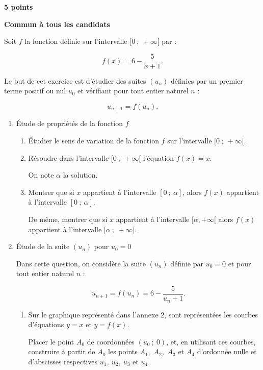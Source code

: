 \textbf{ \hfill 5 points}
 
\textbf{Commun à tous les candidats}

\medskip

Soit $f$ la fonction définie sur l'intervalle $[0~;~+ \infty[$ par :

\[ f(x) = 6 -  \dfrac{5}{x + 1}.\]
 
Le but de cet exercice est d'étudier des suites $\left(u_{n}\right)$ définies par un premier terme positif ou nul $u_{0}$ et v\'erifiant pour tout entier naturel $n$ :
 
\[u_{n+1} = f\left(u_{n}\right).\]
 
\begin{enumerate}
\item  Étude de propriétés de la fonction $f$ 
	\begin{enumerate}
		\item Étudier le sens de variation de la fonction $f$ sur l'intervalle $[0~;~+ \infty[$. 
		\item Résoudre dans l'intervalle $[0~;~+ \infty[$ l'équation $f(x) = x$.
		 
On note $\alpha$ la solution. 
		\item Montrer que si $x$ appartient à l'intervalle $[0~;~\alpha]$, alors $f(x)$ appartient à l'intervalle $[0~;~\alpha]$.
		 
De même, montrer que si $x$ appartient à l'intervalle $[\alpha, + \infty[$ alors $f(x)$ appartient à l'intervalle $[\alpha~;~ + \infty[$.
	\end{enumerate}
	 
\item Étude de la suite $\left(u_{n}\right)$ pour $u_{0} = 0$
 
Dans cette question, on considère la suite $\left(u_{n}\right)$ définie par $u_{0} = 0$ et pour tout entier naturel $n$ :

\[u_{n + 1} = f\left(u_{n}\right) = 6 - \dfrac{5}{u_{n} + 1}.\] 

	\begin{enumerate}
		\item Sur le graphique représenté dans l'annexe 2, sont représentées les courbes d'équations $y = x$ et $y=f(x)$.
		 
Placer le point $A_{0}$ de coordonnées $\left(u_{0}~ ;~0\right)$, et, en utilisant ces courbes, construire à partir de $A_{0}$ les points $A_{1}$,~$A_{2}$,~$A_{3}$  et $A_{4}$ d'ordonnée nulle et d'abscisses respectives $u_{1},~u_{2},~u_{3}$ et $u_{4}$.
 

\end{enumerate}
\end{enumerate}
